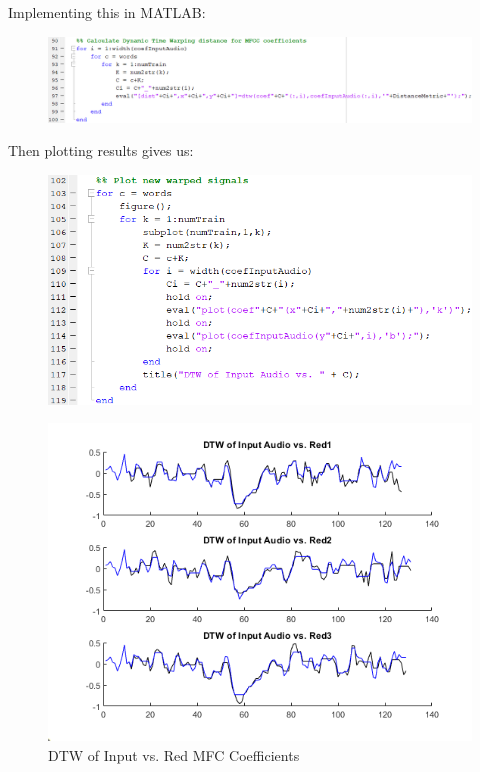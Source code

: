 \documentclass{article}
\begin{document}
Implementing this in MATLAB:

\begin{figure}[H]
    \centering
    \includegraphics[width=\linewidth]{MATLAB_dtw.png}
    \caption{}
    \label{fig:MATLAB_dtw}
\end{figure}

Then plotting results gives us:

\begin{figure}[H]
    \centering
    \includegraphics[width=\linewidth]{MATLAB_plotwarped.png}
    \caption{}
    \label{fig:MATLAB_plotwarped}
\end{figure}

\begin{figure}[H]
    \centering
    \includegraphics[width=\linewidth]{DTWMFCC_R.png}
    \caption{DTW of Input vs. Red MFC Coefficients}
    \label{fig:MATLAB_dtwR}
\end{figure}
\end{document}

